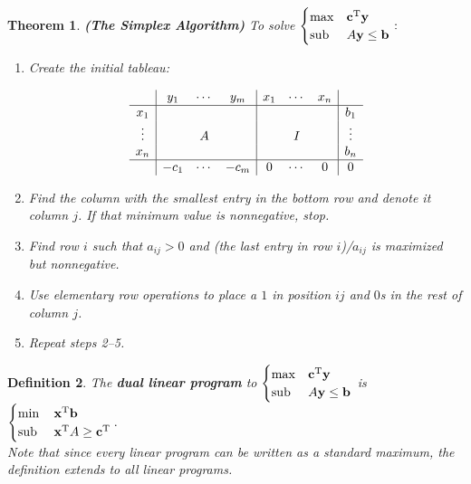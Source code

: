 \documentclass{article}
\theoremstyle{colontheorem}
\newtheorem{theorem}{Theorem}[section]
\newtheorem{definition}[theorem]{Definition}
\newcommand{\T}{^\textnormal{T}}
\newcommand{\Sub}{\textnormal{sub }}
\newenvironment{Theorem}
{
	\begin{mdframed}[backgroundcolor=TheoremOrange!10]
	\begin{theorem}
}
{
	\end{theorem}
	\end{mdframed}
	
	\vspace{.15in}
}
\newenvironment{Def}
{
	\begin{mdframed}[backgroundcolor=DefGreen!10]
	\begin{definition}
}
{
	\end{definition}
	\end{mdframed}
	
	\vspace{.15in}
}
\begin{document}
\begin{Theorem}
	
	\textbf{(The Simplex Algorithm)} To solve $
	\begin{cases}
	\max & \mathbf{c}\T \mathbf{y}\\
	\Sub & A \mathbf{y} \leq \mathbf{b}
	\end{cases}:
	$
	
	\begin{enumerate}
		
		\item Create the initial tableau:
		
		$$
		\begin{array}{c|ccc|ccc|c}
		 & y_1 & \cdots & y_m & x_1 & \cdots & x_n & \\
		 \hline
		 x_1 & & & & & & & b_1\\
		 \vdots & & A & & & I & & \vdots\\
		 x_n & & & & & & & b_n\\
		 \hline
	   	 & -c_1 & \cdots & -c_m & 0 & \cdots & 0 & 0
		
		\end{array}
		$$
		
		\item Find the column with the smallest entry in the bottom row and denote it column $j$. If that minimum value is nonnegative, stop.
		
		\item Find row $i$ such that $a_{ij} > 0$ and (the last entry in row $i$)/$a_{ij}$ is maximized but nonnegative.
		
		\item Use elementary row operations to place a $1$ in position $ij$ and $0$s in the rest of column $j$.
		
		\item Repeat steps 2--5.
		
	\end{enumerate}
	
\end{Theorem}



\begin{Def}
	
	The \textbf{dual linear program} to $
	\begin{cases}
	\max & \mathbf{c}\T \mathbf{y}\\
	\Sub & A \mathbf{y} \leq \mathbf{b}
	\end{cases}$ is $
	\begin{cases}
	\min & \mathbf{x}\T \mathbf{b}\\
	\Sub & \mathbf{x}\T A \geq \mathbf{c}\T
	\end{cases}.$\\
	
	Note that since every linear program can be written as a standard maximum, the definition extends to all linear programs.
	
\end{Def}
\end{document}
